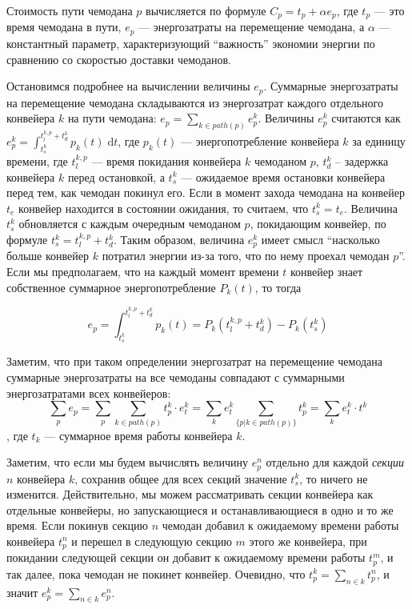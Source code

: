 \documentclass[specification,annotation,times]{itmo-student-thesis}
\theoremstyle{definition}
\begin{document}
Стоимость пути чемодана $p$ вычисляется по формуле $C_p = t_p + \alpha e_p$, где
$t_p$ --- это время чемодана в пути, $e_p$ --- энергозатраты на перемещение чемодана,
а $\alpha$ --- константный параметр, характеризующий \enquote{важность} экономии
энергии по сравнению со скоростью доставки чемоданов.

Остановимся подробнее на вычислении величины $e_p$. Суммарные энергозатраты на
перемещение чемодана складываются из энергозатрат каждого отдельного конвейера
$k$ на пути чемодана: $e_p = \sum\limits_{k \in path(p)} {e_p^k}$.
Величины $e_p^k$ считаются как
$e_p^k = \int_{t_s^k}^{t_l^{k,p} + t_d^k} \! p_k(t) \; \mathrm{d}t$, где $p_k(t)$ ---
энергопотребление конвейера $k$ за единицу времени, где $t_l^{k,p}$ --- время
покидания конвейера $k$
чемоданом $p$, $t_d^k$ -- задержка конвейера $k$ перед остановкой, а $t_s^k$ ---
ожидаемое время остановки конвейера перед тем, как чемодан покинул его. Если в
момент захода чемодана на конвейер $t_e$ конвейер находится в состоянии
ожидания, то считаем, что $t_s^k = t_e$. Величина $t_s^k$ обновляется с каждым
очередным чемоданом $p$, покидающим конвейер, по формуле
$t_s^k = t_l^{k,p} + t_d^k$. Таким образом, величина $e_p^k$ имеет смысл
\enquote{насколько больше конвейер $k$ потратил энергии из-за того, что по нему
  проехал чемодан $p$}. Если мы предполагаем, что на каждый момент времени $t$
конвейер знает собственное суммарное энергопотребление $P_k(t)$, то тогда

\begin{equation}
e_p = \int_{t_s^k}^{t_l^{k,p} + t_d^k} \! p_k(t) = P_k(t_l^{k,p} + t_d^k) - P_k(t_s^k)
\end{equation}

Заметим, что при таком определении энергозатрат на перемещение чемодана
суммарные энергозатраты на все чемоданы совпадают с суммарными энергозатратами
всех конвейеров:
\begin{equation}
\sum\limits_p {e_p} = \sum\limits_p {\sum\limits_{k \in path(p)} {t_p^k \cdot
    e_t^k}} = \sum\limits_k {e_t^k \sum\limits_{\{p | k \in path(p)\}} {t_p^k}}
= \sum\limits_k {e_t^k \cdot t^k} 
\end{equation},
где $t_k$ --- суммарное время работы конвейера $k$.

Заметим, что если мы будем вычислять величину $e_p^n$ отдельно для каждой
\textit{секции} $n$ конвейера $k$, сохранив общее для всех секций значение
$t_s^k$, то ничего не изменится. Действительно, мы можем рассматривать секции
конвейера как отдельные конвейеры, но запускающиеся и останавливающиеся в одно и
то же время. Если покинув секцию $n$ чемодан добавил к ожидаемому времени работы
конвейера $t_p^n$ и перешел в следующую секцию $m$ этого же конвейера, при покидании
следующей секции он добавит к ожидаемому времени работы $t_p^m$, и так далее,
пока чемодан не покинет конвейер. Очевидно, что $t_p^k = \sum_{n \in k} t_p^n$,
и значит $e_p^k = \sum_{n \in k} e_p^n$. 
\end{document}
